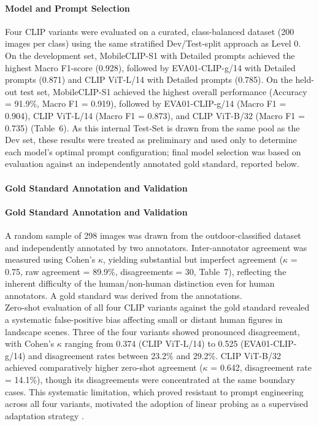 \documentclass[hidelinks, 11pt]{article}
\begin{document}
\paragraph{Model and Prompt Selection}
Four CLIP variants were evaluated on a curated, class-balanced dataset (200 images per class) using the same stratified Dev/Test-split approach as Level 0. On the development set, MobileCLIP-S1 with Detailed prompts achieved the highest Macro F1-score (0.928), followed by EVA01-CLIP-g/14 with Detailed prompts (0.871) and CLIP ViT-L/14 with Detailed prompts (0.785). On the held-out test set, MobileCLIP-S1 achieved the highest overall performance (Accuracy = 91.9\%, Macro F1 = 0.919), followed by EVA01-CLIP-g/14 (Macro F1 = 0.904), CLIP ViT-L/14 (Macro F1 = 0.873), and CLIP ViT-B/32 (Macro F1 = 0.735) (Table~6). As this internal Test-Set is drawn from the same pool as the Dev set, these results were treated as preliminary and used only to determine each model's optimal prompt configuration; final model selection was based on evaluation against an independently annotated gold standard, reported
below.


\paragraph{Gold Standard Annotation and Validation}

\paragraph{Gold Standard Annotation and Validation}
A random sample of 298 images was drawn from the outdoor-classified dataset and independently annotated by two annotators. Inter-annotator agreement was measured using Cohen's $\kappa$, yielding substantial but imperfect agreement ($\kappa$ = 0.75, raw agreement = 89.9\%, disagreements = 30, Table~7), reflecting the inherent difficulty of the human/non-human distinction even for human annotators. A gold standard was derived from the annotations.
\\
Zero-shot evaluation of all four CLIP variants against the gold standard revealed a systematic false-positive bias affecting small or distant human figures in landscape scenes. Three of the four variants showed pronounced disagreement, with Cohen's $\kappa$ ranging from 0.374 (CLIP ViT-L/14) to 0.525 (EVA01-CLIP-g/14) and disagreement rates between 23.2\% and 29.2\%.
CLIP ViT-B/32 achieved comparatively higher zero-shot agreement ($\kappa$ = 0.642, disagreement rate = 14.1\%), though its disagreements were concentrated at the same boundary cases. This systematic limitation, which proved resistant to prompt engineering across all four variants, motivated the adoption of linear probing as a supervised adaptation strategy
\citep{radford_learning_2021}.
\end{document}
